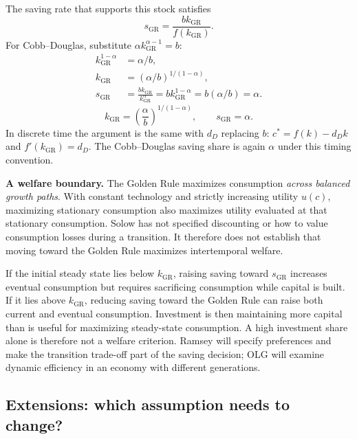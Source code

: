 The saving rate that supports this stock satisfies
\begin{equation}
s_{\mathrm{GR}}=\frac{bk_{\mathrm{GR}}}{f(k_{\mathrm{GR}})}.
\end{equation}
For Cobb--Douglas, substitute
$\alpha k_{\mathrm{GR}}^{\alpha-1}=b$:
\begin{align}
k_{\mathrm{GR}}^{1-\alpha}&=\alpha/b,\\
k_{\mathrm{GR}}&=(\alpha/b)^{1/(1-\alpha)},\\
s_{\mathrm{GR}}&=\frac{bk_{\mathrm{GR}}}{k_{\mathrm{GR}}^\alpha}
 =bk_{\mathrm{GR}}^{1-\alpha}=b(\alpha/b)=\alpha.
\end{align}
\begin{equation}
k_{\mathrm{GR}}=\left(\frac{\alpha}{b}\right)^{1/(1-\alpha)},
\qquad s_{\mathrm{GR}}=\alpha.
\end{equation}
In discrete time the argument is the same with $d_D$ replacing $b$:
$c^*=f(k)-d_Dk$ and $f'(k_{\mathrm{GR}})=d_D$. The Cobb--Douglas saving share
is again $\alpha$ under this timing convention.

\begin{blueblock}
\textbf{A welfare boundary.}
The Golden Rule maximizes consumption \emph{across balanced growth paths}.
With constant technology and strictly increasing utility $u(c)$, maximizing
stationary consumption also maximizes utility evaluated at that stationary
consumption. Solow has not specified discounting or how to value consumption
losses during a transition. It therefore does not establish that
moving toward the Golden Rule maximizes intertemporal welfare.
\end{blueblock}

If the initial steady state lies below $k_{\mathrm{GR}}$, raising saving toward
$s_{\mathrm{GR}}$ increases eventual consumption but requires sacrificing
consumption while capital is built. If it lies above $k_{\mathrm{GR}}$, reducing
saving toward the Golden Rule can raise both current and eventual consumption.
Investment is then maintaining more capital than is useful for maximizing
steady-state consumption. A high investment share alone is therefore not a
welfare criterion. Ramsey will specify preferences and make the transition
trade-off part of the saving decision; OLG will examine dynamic efficiency in
an economy with different generations.

\subsection{Extensions: which assumption needs to change?}\label{sec:solow-extensions}

